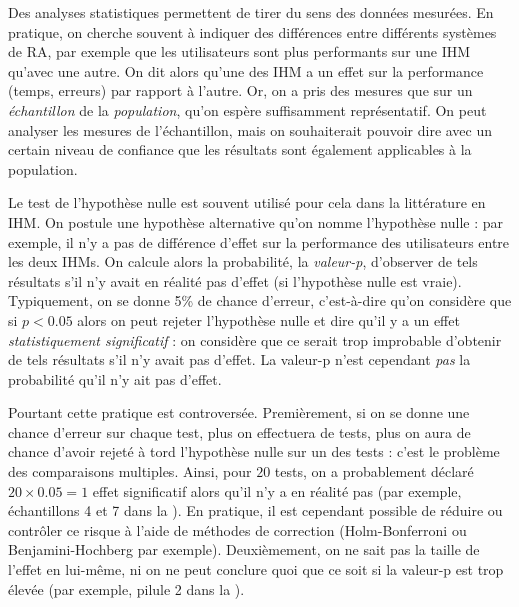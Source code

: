 Des analyses statistiques permettent de tirer du sens des données mesurées. En pratique, on cherche souvent à indiquer des différences entre différents systèmes de RA, par exemple que les utilisateurs sont plus performants sur une IHM qu'avec une autre. On dit alors qu'une des IHM a un effet sur la performance (temps, erreurs) par rapport à l'autre. Or, on a pris des mesures que sur un \emph{échantillon} de la \emph{population}, qu'on espère suffisamment représentatif. On peut analyser les mesures de l'échantillon, mais on souhaiterait pouvoir dire avec un certain niveau de confiance que les résultats sont également applicables à la population.

Le test de l'hypothèse nulle est souvent utilisé pour cela dans la littérature en IHM. On postule une hypothèse alternative qu'on nomme l'hypothèse nulle : par exemple, il n'y a pas de différence d'effet sur la performance des utilisateurs entre les deux IHMs. On calcule alors la probabilité, la \emph{valeur-p}, d'observer de tels résultats s'il n'y avait en réalité pas d'effet (si l'hypothèse nulle est vraie). Typiquement, on se donne 5\% de chance d'erreur, c'est-à-dire qu'on considère que si $p < 0.05$ alors on peut rejeter l'hypothèse nulle et dire qu'il y a un effet \emph{statistiquement significatif} : on considère que ce serait trop improbable d'obtenir de tels résultats s'il n'y avait pas d'effet. La valeur-p n'est cependant \emph{pas} la probabilité qu'il n'y ait pas d'effet.


Pourtant cette pratique est controversée. Premièrement, si on se donne une chance d'erreur sur chaque test, plus on effectuera de tests, plus on aura de chance d'avoir rejeté à tord l'hypothèse nulle sur un des tests : c'est le problème des comparaisons multiples. Ainsi, pour $20$ tests, on a probablement déclaré $20 \times 0.05 = 1$ effet significatif alors qu'il n'y a en réalité pas (par exemple, échantillons 4 et 7 dans la ). En pratique, il est cependant possible de réduire ou contrôler ce risque à l'aide de méthodes de correction (Holm-Bonferroni ou Benjamini-Hochberg par exemple). Deuxièmement, on ne sait pas la taille de l'effet en lui-même, ni on ne peut conclure quoi que ce soit si la valeur-p est trop élevée (par exemple, pilule 2 dans la ).

